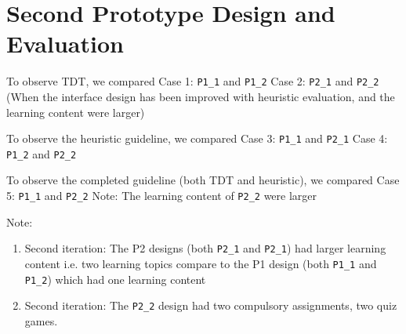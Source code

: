 \chapter{Second Prototype Design and Evaluation}
To observe TDT, we compared 
Case 1: \verb|P1_1| and \verb|P1_2| 
Case 2: \verb|P2_1| and \verb|P2_2| (When the interface design has been improved with heuristic evaluation, and the learning content were larger) 

To observe the heuristic guideline, we compared  
Case 3: \verb|P1_1| and \verb|P2_1| 
Case 4: \verb|P1_2| and \verb|P2_2| 

To observe the completed guideline (both TDT and heuristic), we compared 
Case 5: \verb|P1_1| and \verb|P2_2| 
Note: The learning content of \verb|P2_2| were larger

Note: 
\begin{enumerate}
\item Second iteration: The P2 designs (both \verb|P2_1| and \verb|P2_1|) had larger learning content i.e. two learning topics compare to the P1 design (both \verb|P1_1| and \verb|P1_2|) which had one learning content

\item Second iteration: The \verb|P2_2| design had two compulsory assignments, two quiz games.
\end{enumerate} 

